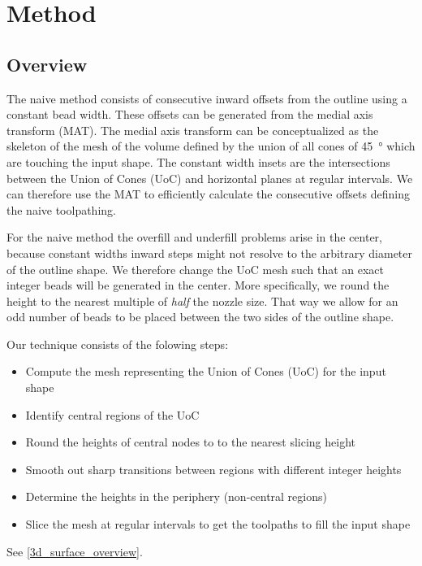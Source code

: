 \section{Method}
\subsection{Overview}
The naive method consists of consecutive inward offsets from the outline using a constant bead width.
These offsets can be generated from the medial axis transform (MAT).
The medial axis transform can be conceptualized as the skeleton of the mesh of the volume defined by the union of all cones of \SI{45}{\degree} which are touching the input shape. \cite{blum1967transformation}
The constant width insets are the intersections between the Union of Cones (UoC) and horizontal planes at regular intervals.
We can therefore use the MAT to efficiently calculate the consecutive offsets defining the naive toolpathing. \cite{eiamsa2003toward}

For the naive method the overfill and underfill problems arise in the center,
because constant widths inward steps might not resolve to the arbitrary diameter of the outline shape.
We therefore change the UoC mesh such that an exact integer beads will be generated in the center.
More specifically, we round the height to the nearest multiple of \emph{half} the nozzle size.
That way we allow for an odd number of beads to be placed between the two sides of the outline shape.

Our technique consists of the folowing steps:
\begin{itemize}
\item Compute the mesh representing the Union of Cones (UoC) for the input shape
\item Identify central regions of the UoC
\item Round the heights of central nodes to to the nearest slicing height
\item Smooth out sharp transitions between regions with different integer heights
\item Determine the heights in the periphery (non-central regions)
\item Slice the mesh at regular intervals to get the toolpaths to fill the input shape
\end{itemize}
See \cref{3d_surface_overview}.






